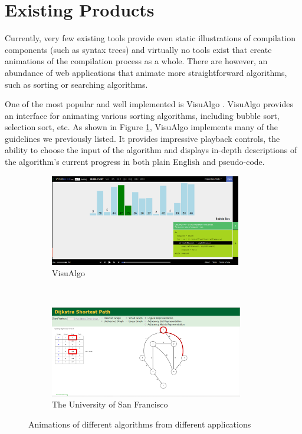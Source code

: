 \documentclass{l4proj}
\begin{document}
\section{Existing Products}
Currently, very few existing tools provide even static illustrations of compilation components (such as syntax trees) and virtually no tools exist that create animations of the compilation process as a whole. There are however, an abundance of web applications that animate more straightforward algorithms, such as sorting or searching algorithms. 

One of the most popular and well implemented is VisuAlgo \cite{visualgo}. VisuAlgo provides an interface for animating various sorting algorithms, including bubble sort, selection sort, etc. As shown in Figure \ref{fig:visualgo}, VisuAlgo implements many of the guidelines we previously listed. It provides impressive playback controls, the ability to choose the input of the algorithm and displays in-depth descriptions of the algorithm's current progress in both plain English and pseudo-code. 

\begin{figure}
	\centering
	\begin{subfigure}[b]{0.45\textwidth}
		\includegraphics[height=4cm,width=\linewidth]{images/visualgo.png}
		\caption{VisuAlgo}
		\label{fig:visualgo}
	\end{subfigure}
	~
	\begin{subfigure}[b]{0.45\textwidth}
		\includegraphics[height=4cm,width=\linewidth]{images/dijkstra.png}
		\caption{The University of San Francisco}
		\label{fig:dijkstra}
	\end{subfigure}
	\caption{Animations of different algorithms from different applications}\label{fig:visualgo-dijkstra}	
\end{figure}
\end{document}
